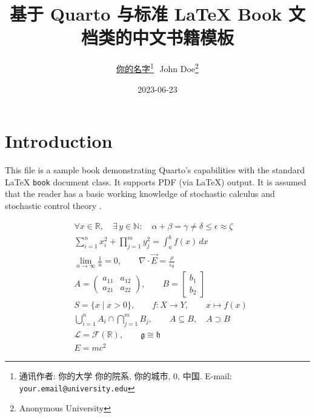\documentclass[
  11pt,
  onesidefontset=none,
]{ctexbook}
\title{\Large 基于 Quarto 与标准 LaTeX Book 文档类的中文书籍模板}
\author{\href{https://your-university.edu/your-profile}{你的名字}\footnote{通讯作者: 你的大学 你的院系, 你的城市, 0, 中国. E-mail: \texttt{your.email@university.edu}}\,~\orcidlink{0000-0000-0000-0001}\hspace{2em}John
Doe\footnote{Anonymous University}}
\date{\small 2023-06-23}
\renewcommand{\contentsname}{目录}%
\renewcommand*\contentsname{目录}
\newcommand\contentsname{目录}
\theoremstyle{plain}
\theoremstyle{plain}
\theoremstyle{definition}
\theoremstyle{plain}
\theoremstyle{remark}
\begin{document}
\maketitle
\clearpage
\mbox{}\thispagestyle{empty}
\clearpage
{}
\markright{}

\makeatletter
\let\theorem\relax\let\c@theorem\relax
\let\lemma\relax\let\c@lemma\relax
\let\corollary\relax\let\c@corollary\relax
\let\definition\relax\let\c@definition\relax
\let\proposition\relax\let\c@proposition\relax
\let\example\relax\let\c@example\relax
\let\remark\relax\let\c@remark\relax
\makeatother
\newtheorem{theorem}{定理}[section]
\newtheorem{lemma}{引理}[section]
\newtheorem{corollary}{推论}[section]
\newtheorem{definition}{定义}[section]
\newtheorem{proposition}{命题}[section]
\newtheorem{example}{例}[section]
\newtheorem{remark}{注}[section]
\renewcommand{\proofname}{证明}
\renewcommand*\contentsname{目录}
{
\setcounter{tocdepth}{1}
\tableofcontents
}

\mainmatter
\chapter{Introduction}\label{sec-intro}

This file is a sample book demonstrating Quarto's capabilities with the
standard LaTeX \texttt{book} document class. It supports PDF (via LaTeX)
output. It is assumed that the reader has a basic working knowledge of
stochastic calculus \citet{karatzas1991brownian} and stochastic control
theory \citet{yong1999sch}.

\[
\begin{aligned}
&\forall x \in \mathbb{R},\quad 
\exists\, y \in \mathbb{N}:\quad 
\alpha + \beta = \gamma \neq \delta \leq \epsilon \approx \zeta \\
&\sum_{i=1}^{n} x_i^2 + \prod_{j=1}^{m} y_j^2 = \int_{a}^{b} f(x)\,dx \\
&\lim_{n\to\infty} \frac{1}{n} = 0, \qquad
\nabla \cdot \vec{E} = \frac{\rho}{\varepsilon_0} \\
&A = \begin{pmatrix} a_{11} & a_{12} \\ a_{21} & a_{22} \end{pmatrix}, \qquad
B = \begin{bmatrix} b_1 \\ b_2 \end{bmatrix} \\
&S = \{ x \mid x > 0 \}, \qquad
f: X \to Y, \qquad
x \mapsto f(x) \\
&\bigcup_{i=1}^n A_i \cap \bigcap_{j=1}^m B_j, \qquad
A \subseteq B, \quad A \supset B \\
&\mathcal{L} = \mathcal{F}(\mathbb{R}), \qquad
\mathfrak{g} \cong \mathfrak{h} \\
&\boxed{E = mc^2}
\end{aligned}
\]
\end{document}
